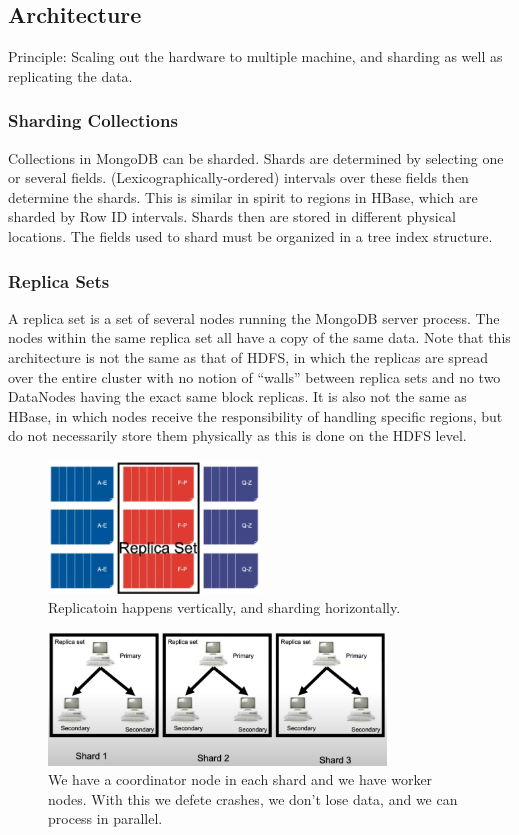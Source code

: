 \subsection{Architecture}

Principle: Scaling out the hardware to multiple machine, and sharding as well as replicating the data.

\subsubsection{Sharding Collections}
Collections in MongoDB can be sharded. Shards are determined by selecting one or several fields. (Lexicographically-ordered) intervals over these fields then determine the shards. This is similar in spirit to regions in HBase, which are sharded by Row ID intervals. Shards then are stored in different physical locations. The fields used to shard must be organized in a tree index structure.

\subsubsection{Replica Sets}
A replica set is a set of several nodes running the MongoDB server process. The nodes within the same replica set all have a copy of the same data. Note that this architecture is not the same as that of HDFS, in which the replicas are spread over the entire cluster with no notion of “walls” between replica sets and no two DataNodes having the exact same block replicas. It is also not the same as HBase, in which nodes receive the responsibility of handling specific regions, but do not necessarily store them physically as this is done on the HDFS level.

\begin{figure}[h]
    \centering
    \includegraphics[width=0.5\textwidth]{Figures/DocumentStoresReplicas.png}
    \caption{Replicatoin happens vertically, and sharding horizontally.}
\end{figure}

\begin{figure}[h]
    \centering
    \includegraphics[width=0.8\textwidth]{Figures/DocumentStoresReplicas2.png}
    \caption{We have a coordinator node in each shard and we have worker nodes. With this we defete crashes, we don't lose data, and we can process in parallel.}
\end{figure}

